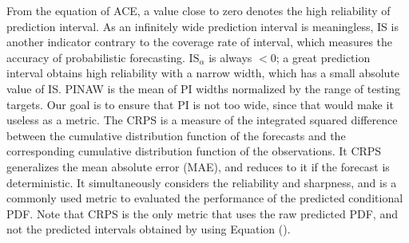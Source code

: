 From the equation of ACE, a value close to zero denotes the high reliability of prediction interval. As an infinitely wide prediction interval is meaningless, IS is another indicator contrary to the coverage rate of interval, which measures the accuracy of probabilistic forecasting. $\mathrm{IS}_{\alpha}$ is always $<0$; a great prediction interval obtains high reliability with a narrow width, which has a small absolute value of IS. PINAW is the mean of PI  widths normalized by the range of testing targets. Our goal is to ensure that PI is not too wide, since that would make it useless as a metric. The CRPS is a measure of the integrated squared difference between the cumulative distribution function of the forecasts and the corresponding cumulative distribution function of the
observations. It CRPS generalizes the mean absolute error (MAE), and reduces to it if the forecast is deterministic. It simultaneously considers the reliability and sharpness, and is a commonly used metric to evaluated the performance of the predicted conditional PDF. Note that CRPS is the only metric that uses the raw predicted PDF, and not the predicted intervals obtained by using Equation ().

\fi
